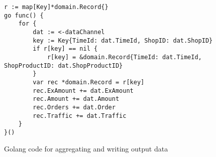 \begin{figure}[!h]
\caption{Golang code for aggregating and writing output data }
\label{fig:golang_code2}
\begin{lstlisting}
r := map[Key]*domain.Record{}
go func() {
	for {
		dat := <-dataChannel
		key := Key{TimeId: dat.TimeId, ShopID: dat.ShopID}
		if r[key] == nil {
			r[key] = &domain.Record{TimeId: dat.TimeId, ShopProductID: dat.ShopProductID}
		}
		var rec *domain.Record = r[key]
		rec.ExAmount += dat.ExAmount
		rec.Amount += dat.Amount
		rec.Orders += dat.Order
		rec.Traffic += dat.Traffic
	}
}()
\end{lstlisting}
\end{figure}

